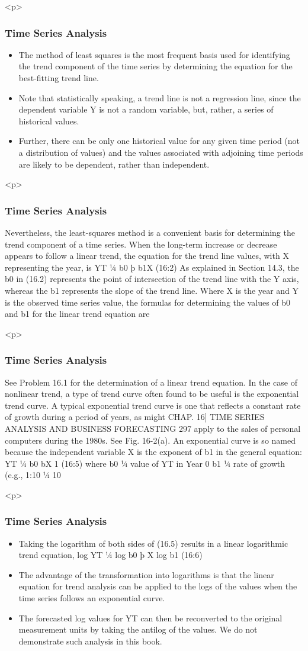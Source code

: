 \documentclass{beamer}
\begin{document}
\begin{itemize}
<p>
\frametitle{Time Series Analysis}
\begin{itemize}
\item The method of least squares is the most frequent basis used for identifying the trend
component of the time series by determining the equation for the best-fitting trend line. 
\item Note that statistically
speaking, a trend line is not a regression line, since the dependent variable Y is not a random variable, but,
rather, a series of historical values. 
\item Further, there can be only one historical value for any given time period (not
a distribution of values) and the values associated with adjoining time periods are likely to be dependent, rather
than independent. 
\end{itemize}

<p>
\frametitle{Time Series Analysis}
Nevertheless, the least-squares method is a convenient basis for determining the trend
component of a time series. When the long-term increase or decrease appears to follow a linear trend, the
equation for the trend line values, with X representing the year, is
YT ¼ b0 þ b1X (16:2)
As explained in Section 14.3, the b0 in (16.2) represents the point of intersection of the trend line with the Y
axis, whereas the b1 represents the slope of the trend line. Where X is the year and Y is the observed time series
value, the formulas for determining the values of b0 and b1 for the linear trend equation are

<p>
\frametitle{Time Series Analysis}
See Problem 16.1 for the determination of a linear trend equation.
In the case of nonlinear trend, a type of trend curve often found to be useful is the exponential trend curve.
A typical exponential trend curve is one that reflects a constant rate of growth during a period of years, as might
CHAP. 16] TIME SERIES ANALYSIS AND BUSINESS FORECASTING 297
apply to the sales of personal computers during the 1980s. See Fig. 16-2(a). An exponential curve is so named
because the independent variable X is the exponent of b1 in the general equation:
YT ¼ b0 bX
1 (16:5)
where b0 ¼ value of YT in Year 0
b1 ¼ rate of growth (e.g., 1:10 ¼ 10%

<p>
\frametitle{Time Series Analysis}
\begin{itemize}
\item Taking the logarithm of both sides of (16.5) results in a linear logarithmic trend equation,
log YT ¼ log b0 þ X log b1 (16:6)
\item The advantage of the transformation into logarithms is that the linear equation for trend analysis can be
applied to the logs of the values when the time series follows an exponential curve.
\item  The forecasted log values
for YT can then be reconverted to the original measurement units by taking the antilog of the values. We do not
demonstrate such analysis in this book.
\end{itemize}


\end{itemize}
\end{document}
